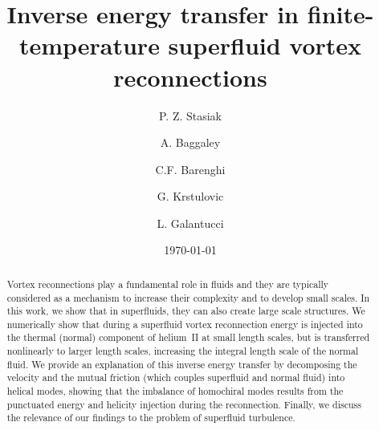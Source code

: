 \documentclass[%
 reprint,
 amsmath,amssymb,
 aps,
 prl,
]{revtex4-2}
\begin{document}

\title{Inverse energy transfer in finite-temperature superfluid vortex reconnections}

\author{P. Z. Stasiak}
\author{A. Baggaley}
\author{C.F. Barenghi}

\author{G. Krstulovic}

\author{L. Galantucci}

\date{\today}%

\begin{abstract}
Vortex reconnections play a fundamental role in fluids and they are typically considered as a mechanism to increase their complexity and to develop small scales. In this work, we show that in superfluids, they can also create large scale structures.
We numerically show that during a superfluid vortex reconnection energy is injected 
into the thermal (normal) component of helium~II at small length scales, but is transferred nonlinearly  to larger length scales, increasing the integral length scale of the normal
fluid.  We provide an explanation of this inverse energy transfer by decomposing the velocity and the mutual friction (which couples superfluid and normal fluid) into helical modes, showing 
that the imbalance of homochiral modes results from the punctuated energy and helicity injection during the reconnection. Finally, we discuss the relevance of our findings to 
the problem of superfluid turbulence.
\end{abstract}

\maketitle
\end{document}
